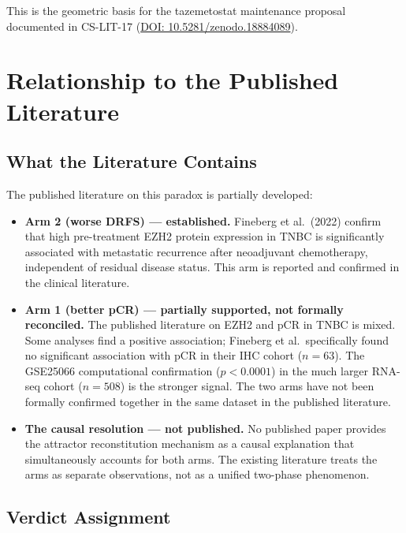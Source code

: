 \documentclass[12pt, a4paper]{article}
\begin{document}
This is the geometric basis for the tazemetostat
maintenance proposal documented in CS-LIT-17
(\href{https://doi.org/10.5281/zenodo.18884089}
{DOI: 10.5281/zenodo.18884089}).

\section{Relationship to the Published Literature}

\subsection{What the Literature Contains}

The published literature on this paradox is
partially developed:

\begin{itemize}
    \item \textbf{Arm 2 (worse DRFS) --- established.}
    Fineberg et al.\ (2022) confirm that high
    pre-treatment EZH2 protein expression in TNBC
    is significantly associated with metastatic
    recurrence after neoadjuvant chemotherapy,
    independent of residual disease status.
    This arm is reported and confirmed in the
    clinical literature.

    \item \textbf{Arm 1 (better pCR) --- partially
    supported, not formally reconciled.}
    The published literature on EZH2 and pCR in TNBC
    is mixed. Some analyses find a positive
    association; Fineberg et al.\ specifically
    found no significant association with pCR in
    their IHC cohort ($n = 63$). The GSE25066
    computational confirmation ($p < 0.0001$) in
    the much larger RNA-seq cohort ($n = 508$) is
    the stronger signal. The two arms have not been
    formally confirmed together in the same dataset
    in the published literature.

    \item \textbf{The causal resolution ---
    not published.}
    No published paper provides the attractor
    reconstitution mechanism as a causal explanation
    that simultaneously accounts for both arms.
    The existing literature treats the arms as
    separate observations, not as a unified
    two-phase phenomenon.
\end{itemize}

\subsection{Verdict Assignment}
\end{document}
